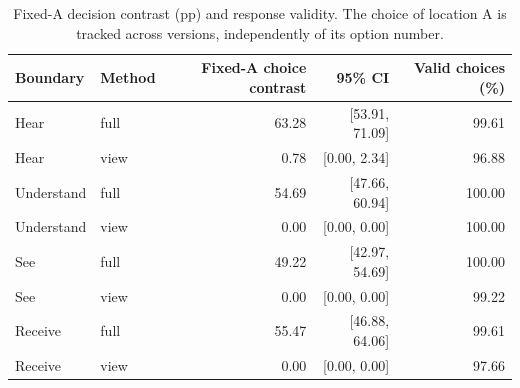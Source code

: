 \documentclass[11pt]{article}
\begin{document}
\begin{table}[t]
\centering\small
\begin{lrbox}{\OCtable}\begin{tabular}{@{}llrrr@{}}
\toprule
Boundary & Method & Fixed-A choice contrast & 95\% CI & Valid choices (\%)\\
\midrule
Hear & full & 63.28 & [53.91, 71.09] & 99.61\\
Hear & view & 0.78 & [0.00, 2.34] & 96.88\\
Understand & full & 54.69 & [47.66, 60.94] & 100.00\\
Understand & view & 0.00 & [0.00, 0.00] & 100.00\\
See & full & 49.22 & [42.97, 54.69] & 100.00\\
See & view & 0.00 & [0.00, 0.00] & 99.22\\
Receive & full & 55.47 & [46.88, 64.06] & 99.61\\
Receive & view & 0.00 & [0.00, 0.00] & 97.66\\
\bottomrule
\end{tabular}\end{lrbox}
\ifdim\wd\OCtable>\linewidth\PackageError{access-paper}{Table tab:decision exceeds its column}{Revise the table layout.}\fi
\usebox{\OCtable}
\caption{Fixed-A decision contrast (pp) and response validity. The choice of location A is tracked across versions, independently of its option number.}
\label{tab:decision}
\end{table}
\end{document}

